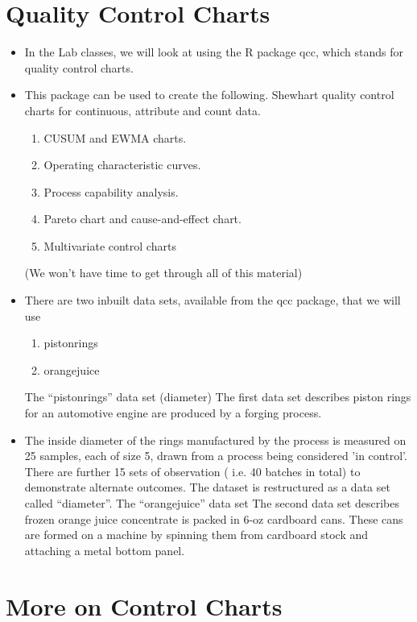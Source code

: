\documentclass[]{report}
\begin{document}
\section{Quality Control Charts}
\begin{itemize}
\item In the Lab classes, we will look at using the R package qcc, which stands for quality
control charts. 
\item This package can be used to create the following.
Shewhart quality control charts for continuous, attribute and count data.
\begin{enumerate}
\item CUSUM and EWMA charts.
\item Operating characteristic curves.
\item Process capability analysis.
\item Pareto chart and cause-and-effect chart.
\item Multivariate control charts
\end{enumerate}
(We won’t have time to get through all of this material)
\item There are two inbuilt data sets, available from the qcc package, that we will use
\begin{enumerate}
\item pistonrings
\item orangejuice
\end{enumerate}

The “pistonrings” data set (diameter)
The first data set describes piston rings for an automotive engine are produced by a
forging process.
\item The inside diameter of the rings manufactured by the process is measured on 25
samples, each of size 5, drawn from a process being considered 'in control'.
There are further 15 sets of observation ( i.e. 40 batches in total) to demonstrate
alternate outcomes.
The dataset is restructured as a data set called “diameter”.
The “orangejuice” data set
The second data set describes frozen orange juice concentrate is packed in 6-oz
cardboard cans. These cans are formed on a machine by spinning them from
cardboard stock and attaching a metal bottom panel.
\end{itemize} 
\section{More on Control Charts}
\end{document}
